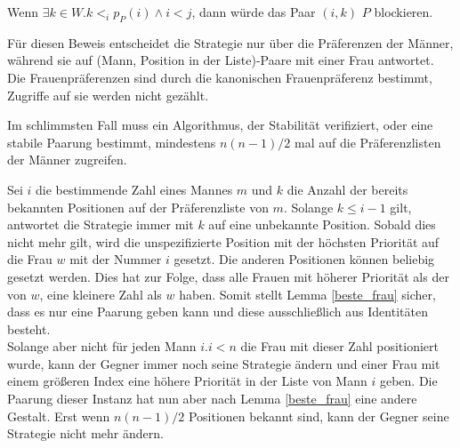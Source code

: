 \begin{Beweis}
\label{beste_frau_bew}
  Wenn $\exists k \in W.k <_{i}p_{P}(i)\land i < j$, dann würde das Paar $(i,k)$ $P$ blockieren.
\end{Beweis}

Für diesen Beweis entscheidet die Strategie nur über die Präferenzen der Männer, während sie auf (Mann, Position in der Liste)-Paare mit einer Frau antwortet. Die Frauenpräferenzen sind durch die kanonischen Frauenpräferenz bestimmt, Zugriffe auf sie werden nicht gezählt.

\begin{Theorem}
\label{keine_gute_loesung}
  Im schlimmsten Fall muss ein Algorithmus, der Stabilität verifiziert, oder eine stabile Paarung bestimmt, mindestens $n(n-1)/2$ mal auf die Präferenzlisten der Männer zugreifen.
\end{Theorem}

\begin{Beweis}
\label{keine_gute_loesung_bew}
  Sei $i$ die bestimmende Zahl eines Mannes $m$ und $k$ die Anzahl der bereits bekannten Positionen auf der Präferenzliste von $m$. Solange $k \leq i-1$ gilt, antwortet die Strategie immer mit $k$ auf eine unbekannte Position. Sobald dies nicht mehr gilt, wird die unspezifizierte Position mit der höchsten Priorität auf die Frau $w$ mit der Nummer $i$ gesetzt. Die anderen Positionen können beliebig gesetzt werden. Dies hat zur Folge, dass alle Frauen mit höherer Priorität als der von $w$, eine kleinere Zahl als $w$ haben. Somit stellt Lemma \ref{beste_frau} sicher, dass es nur eine Paarung geben kann und diese ausschließlich aus Identitäten besteht.\\
  Solange aber nicht für jeden Mann $i. i < n$ die Frau mit dieser Zahl positioniert wurde, kann der Gegner immer noch seine Strategie ändern und einer Frau mit einem größeren Index eine höhere Priorität in der Liste von Mann $i$ geben. Die Paarung dieser Instanz hat nun aber nach Lemma \ref{beste_frau} eine andere Gestalt. Erst wenn $n(n-1)/2$ Positionen bekannt sind, kann der Gegner seine Strategie nicht mehr ändern.
\end{Beweis}
